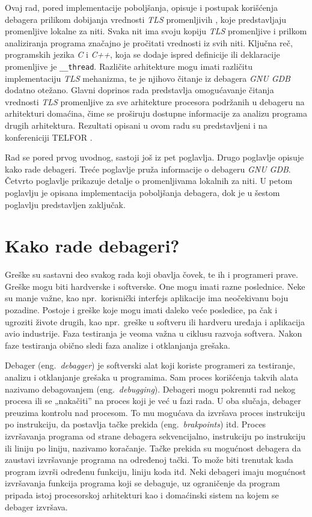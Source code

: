 \documentclass[12pt,oneside]{memoir}
\begin{document}
Ovaj rad, pored implementacije poboljšanja, opisuje i postupak korišćenja debagera prilikom dobijanja vrednosti \emph{TLS} promenljivih \cite{TLS}, koje predstavljaju promenljive lokalne za niti. Svaka nit ima svoju kopiju \emph{TLS} promenljive i prilkom analiziranja programa značajno je pročitati vrednosti iz svih niti. Ključna reč, programskih jezika \emph{C} i \emph{C++}, koja se dodaje ispred definicije ili deklaracije promenljive je \texttt{\_\_thread}. Različite arhitekture mogu imati različitu implementaciju \emph{TLS} mehanizma, te je njihovo čitanje iz debagera \emph{GNU GDB} dodatno otežano.
Glavni doprinos rada predstavlja omogućavanje čitanja vrednosti \emph{TLS} promenljive za sve arhitekture procesora podržanih u debageru na arhitekturi domaćina, čime se proširuju dostupne informacije za analizu programa drugih arhitektura. Rezultati opisani u ovom radu su predstavljeni i na konfereniciji TELFOR \cite{TELFOR}.

Rad se pored prvog uvodnog, sastoji još iz pet poglavlja. Drugo poglavlje opisuje kako rade debageri. Treće poglavlje pruža informacije o debageru \emph{GNU GDB}. Četvrto poglavlje prikazuje detalje o promenljivama lokalnih za niti. U petom poglavlju je opisana implementacija poboljšanja debagera, dok je u šestom poglavlju predstavljen zaključak.



\chapter{Kako rade debageri?}
\label{chp:debageri}

Greške su sastavni deo svakog rada koji obavlja čovek, te ih i programeri prave. Greške mogu biti hardverske i softverske. One mogu imati razne poslednice. Neke su manje važne, kao npr.~korisnički interfejs aplikacije ima neočekivanu boju pozadine. Postoje i greške koje mogu imati daleko veće posledice, pa čak i ugroziti živote drugih, kao npr.~greške u softveru ili hardveru uređaja i aplikacija avio industrije. Faza testiranja je veoma važna u ciklusu razvoja softvera. Nakon faze testiranja obično sledi faza analize i otklanjanja grešaka.

Debager (eng.~\emph{debagger}) je softverski alat koji koriste programeri za testiranje, analizu i otklanjanje grešaka u programima. Sam proces korišćenja takvih alata nazivamo debagovanjem (eng.~\emph{debugging}).
Debageri mogu pokrenuti rad nekog procesa ili se „nakačiti” na proces koji je već u fazi rada. U oba slučaja, debager preuzima kontrolu nad procesom. To mu mogućava da izvršava proces instrukciju po instrukciju, da postavlja tačke prekida (eng.~\emph{brakpoints}) itd. Proces izvršavanja programa od strane debagera sekvencijalno, instrukciju po instrukciju ili liniju po liniju, nazivamo koračanje. Tačke prekida su mogućnost debagera da zaustavi izvršavanje programa na određenoj tački. To može biti trenutak kada program izvrši određenu funkciju, liniju koda itd. Neki debageri imaju mogućnost izvršavanja funkcija programa koji se debaguje, uz ograničenje da program pripada istoj procesorskoj arhitekturi kao i domaćinski sistem na kojem se debager izvršava.
\end{document}
